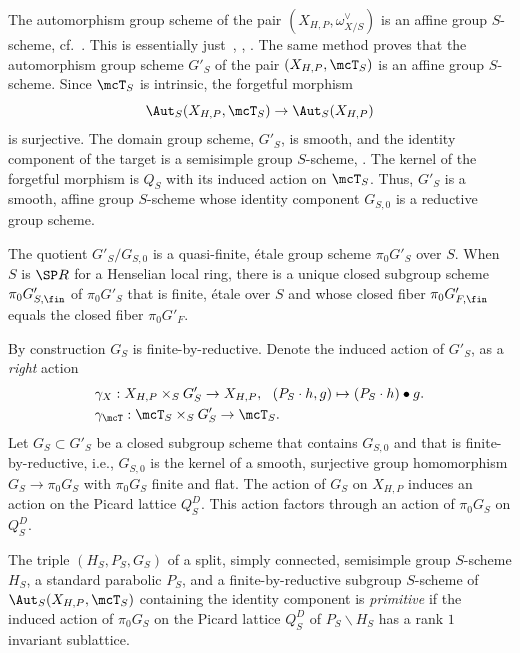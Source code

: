 The automorphism group scheme of the pair $(X_{H,P},\omega_{X/S}^\vee)$ is an affine group $S$-scheme, cf.~\cite[Section~2.1]{dJS8}. This is essentially just~\cite[No. 221, Section~4.c]{FGA}, \cite[Corollaire~7.7.8]{EGA3}, \cite[Théorème~4.6.2.1]{LM-B}. The same method proves that the automorphism group scheme $G'_S$ of the pair $(X_{H,P},\mcT_S)$ is an affine group $S$-scheme. Since $\mcT_S$ is intrinsic, the forgetful morphism
\[
\Aut_S(X_{H,P},\mcT_S) \to \Aut_S(X_{H,P})
\]
is surjective. The domain group scheme, $G'_S$, is smooth, and the identity component of the target is a semisimple group $S$-scheme, \cite[Proposition~4]{Demazure-Aut}. The kernel of the forgetful morphism is $Q_S$ with its induced action on $\mcT_S$. Thus, $G'_S$ is a smooth, affine group $S$-scheme whose identity component $G_{S,0}$ is a reductive group scheme.

The quotient $G'_S/G_{S,0}$ is a quasi-finite, étale group scheme $\pi_0 G'_S$ over $S$. When $S$ is $\SP R$ for a Henselian local ring, there is a unique closed subgroup scheme $\pi_0 G'_{S,\fin}$ of $\pi_0 G'_S$ that is finite, étale over $S$ and whose closed fiber $\pi_0 G'_{F,\fin}$ equals the closed fiber $\pi_0 G'_F$.


By construction $G_S$ is finite-by-reductive. Denote the induced action of $G'_S$, as a
\emph{right} action
\begin{align*}
&\gamma_X: X_{H,P} \times_S G'_S \to X_{H,P}, \ \ (P_S\cdot h,g) \mapsto (P_S\cdot h)\bullet g.
\\
&\gamma_\mcT: \mcT_S \times_S G'_S \to \mcT_S.
\end{align*}
Let $G_S\subset G'_S$ be a closed subgroup scheme that contains $G_{S,0}$ and that is finite-by-reductive, i.e., $G_{S,0}$ is the kernel of a smooth, surjective group homomorphism $G_S\to \pi_0 G_S$ with $\pi_0 G_S$ finite and flat. The action of $G_S$ on $X_{H,P}$ induces an action on the Picard lattice $Q_S^D$. This action factors through an action of $\pi_0 G_S$ on $Q_S^D$.

\begin{defi} \label{defn-prim}
The triple $(H_S,P_S,G_S)$ of a split, simply connected, semisimple group $S$-scheme $H_S$, a standard parabolic $P_S$, and a finite-by-reductive subgroup $S$-scheme of $\Aut_S(X_{H,P},\mcT_S)$ containing the identity component is \emph{primitive} if the induced action of $\pi_0 G_S$ on the Picard lattice $Q^D_S$ of $P_S\backslash H_S$ has a rank $1$ invariant sublattice.
\end{defi}

